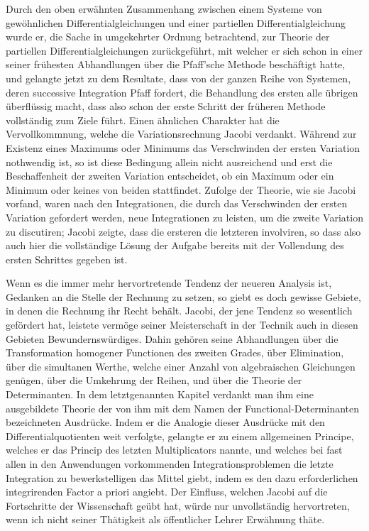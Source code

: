 \documentclass[11pt]{article}
\begin{document}
Durch den oben erwähnten Zusammenhang zwischen einem Systeme von gewöhnlichen Differentialgleichungen und einer partiellen Differentialgleichung wurde er, die Sache in umgekehrter Ordnung betrachtend, zur Theorie der partiellen Differentialgleichungen zurückgeführt, mit welcher er sich schon in einer seiner frühesten Abhandlungen über die Pfaff’sche Methode beschäftigt hatte, und gelangte jetzt zu dem Resultate, dass von der ganzen Reihe von Systemen, deren successive Integration Pfaff fordert, die Behandlung des ersten alle übrigen überflüssig macht, dass also schon der erste Schritt der früheren Methode vollständig zum Ziele führt. Einen ähnlichen Charakter hat die Vervollkommnung, welche die Variationsrechnung Jacobi verdankt. Während zur Existenz eines Maximums oder Minimums das Verschwinden der ersten Variation nothwendig ist, so ist diese Bedingung allein nicht ausreichend und erst die Beschaffenheit der zweiten Variation entscheidet, ob ein Maximum oder ein Minimum oder keines von beiden stattfindet. Zufolge der Theorie, wie sie Jacobi vorfand, waren nach den Integrationen, die durch das Verschwinden der ersten Variation gefordert werden, neue Integrationen zu leisten, um die zweite Variation zu discutiren; Jacobi zeigte, dass die ersteren die letzteren involviren, so dass also auch hier die vollständige Lösung der Aufgabe bereits mit der Vollendung des ersten Schrittes gegeben ist.

Wenn es die immer mehr hervortretende Tendenz der neueren Analysis ist, Gedanken an die Stelle der Rechnung zu setzen, so giebt es doch gewisse Gebiete, in denen die Rechnung ihr Recht behält. Jacobi, der jene Tendenz so wesentlich gefördert hat, leistete vermöge seiner Meisterschaft in der Technik auch in diesen Gebieten Bewundernswürdiges. Dahin gehören seine Abhandlungen über die Transformation homogener Functionen des zweiten Grades, über Elimination, über die simultanen Werthe, welche einer Anzahl von algebraischen Gleichungen genügen, über die Umkehrung der Reihen, und über die Theorie der Determinanten. In dem letztgenannten Kapitel verdankt man ihm eine ausgebildete Theorie der von ihm mit dem Namen der Functional-Determinanten bezeichneten Ausdrücke. Indem er die Analogie dieser Ausdrücke mit den Differentialquotienten weit verfolgte, gelangte er zu einem allgemeinen Principe, welches er das Princip des letzten Multiplicators nannte, und welches bei fast allen in den Anwendungen vorkommenden Integrationsproblemen die letzte Integration zu bewerkstelligen das Mittel giebt, indem es den dazu erforderlichen integrirenden Factor a priori angiebt. Der Einfluss, welchen Jacobi auf die Fortschritte der Wissenschaft geübt hat, würde nur unvollständig hervortreten, wenn ich nicht seiner Thätigkeit als öffentlicher Lehrer Erwähnung thäte.
\end{document}

